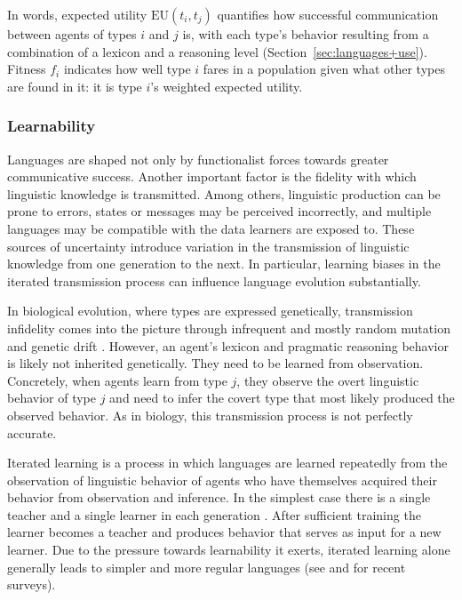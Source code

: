 \documentclass[a4paper, 11pt]{article}
\theoremstyle{Satz}
\begin{document}
In words, expected utility $\text{EU}(t_i,t_j)$ quantifies how successful communication between agents of types $i$ and $j$ is, with each type's behavior resulting from a combination of a lexicon and a reasoning level (Section~\ref{sec:languages+use}). Fitness $f_i$ indicates how well type $i$ fares in a population given what other types are found in it: it is type $i$'s weighted expected utility.

\subsubsection{Learnability}
\label{sec:learnability}
Languages are shaped not only by functionalist forces towards greater communicative success. Another
important factor is the fidelity with which linguistic knowledge is transmitted. Among others,
linguistic production can be prone to errors, states or messages may be perceived incorrectly,
and multiple languages may be compatible with the data learners are exposed to. These sources
of uncertainty introduce variation in the transmission of linguistic knowledge from one
generation to the next. In particular, learning biases in the iterated transmission process can
influence language evolution substantially.

In biological evolution, where types are expressed genetically, transmission infidelity comes
into the picture through infrequent and mostly random mutation and genetic drift \citep{kimura:1983}. However, an agent's
lexicon and pragmatic reasoning behavior is likely not inherited genetically. They need to be
learned from observation.  Concretely, when agents learn from type $j$, they observe the overt linguistic behavior of type $j$ and need to infer the covert type that most likely produced the observed behavior. As in biology, this transmission process is not perfectly accurate. 

Iterated learning is a process in which languages are learned repeatedly from the observation of linguistic behavior of agents who have themselves acquired their behavior from observation and inference. In the simplest case there is a single teacher and a single learner in each generation \citep[e.g.,][]{kirby:2001,brighton:2002}. After sufficient training the learner becomes a teacher and produces behavior that serves as input for a new learner. Due to the pressure towards learnability it exerts, iterated learning alone generally leads to simpler
and more regular languages (see \citealt{kirby+etal:2014} and \citealt{tamariz+kirby:2016} for
recent surveys).
\end{document}
